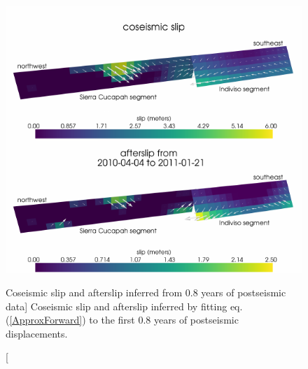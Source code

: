 \begin{figure}
\includegraphics[scale=1.0]{ch3/figures/2016jb013114-p11}
\caption
[Coseismic slip and afterslip inferred from 0.8 years of postseismic
data]
{Coseismic slip and afterslip inferred by fitting eq.
(\ref{ApproxForward}) to the first 0.8 years of postseismic
displacements.}
\label{ch3:fig:InitialSlip}
\end{figure} 

